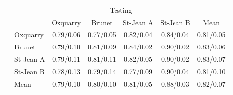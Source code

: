 \begin{table}
  \vspace{0.5cm}

  \begin{tabular}{l l| c c c c|c}
    \toprule
    \multicolumn{2}{c}{\multirow{2}{*}{}} & \multicolumn{4}{c}{Testing} \\
    \multicolumn{2}{c}{} & Oxquarry & Brunet & St-Jean A & St-Jean B & Mean \\
    \midrule
    \parbox[t]{2mm}{}
    & Oxquarry  & 0.79/0.06 & 0.77/0.05 & 0.82/0.04 & 0.84/0.04 & 0.81/0.05 \\
    & Brunet    & 0.79/0.10 & 0.81/0.09 & 0.84/0.02 & 0.90/0.02 & 0.83/0.06 \\
    & St-Jean A & 0.79/0.11 & 0.81/0.11 & 0.82/0.05 & 0.90/0.02 & 0.83/0.07 \\
    & St-Jean B & 0.78/0.13 & 0.79/0.14 & 0.77/0.09 & 0.90/0.04 & 0.81/0.10 \\
    \midrule
    & Mean      & 0.79/0.10 & 0.80/0.10 & 0.81/0.05 & 0.88/0.03 & 0.82/0.07 \\
    \bottomrule
  \end{tabular}

\end{table}
